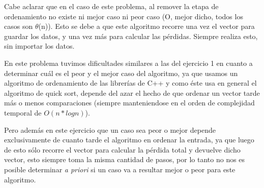 Cabe aclarar que en el caso de este problema, al remover la etapa de ordenamiento no existe ni mejor caso ni peor caso (O, mejor dicho, todos los casos son $\theta$(n)). Esto se debe a que este algoritmo recorre una vez el vector para guardar los datos, y una vez más para calcular las pérdidas. Siempre realiza esto, sin importar los datos.

En este problema tuvimos dificultades similares a las del ejercicio 1 en cuanto a determinar cuál es el peor y el mejor caso del algoritmo, ya que usamos un algoritmo de ordenamiento de las librerías de C++ y como éste usa en general el algoritmo de quick sort, depende del azar el hecho de que ordenar un vector tarde más o menos comparaciones (siempre manteniendose en el orden de complejidad temporal de $O(n * log n)$).

Pero además en este ejercicio que un caso sea peor o mejor depende exclusivamente de cuanto tarde el algoritmo en ordenar la entrada, ya que luego de esto sólo recorre el vector para calcular la pérdida total y devuelve dicho vector, esto siempre toma la misma cantidad de pasos, por lo tanto no nos es posible determinar \emph{a priori} si un caso va a resultar mejor o peor para este algoritmo.


